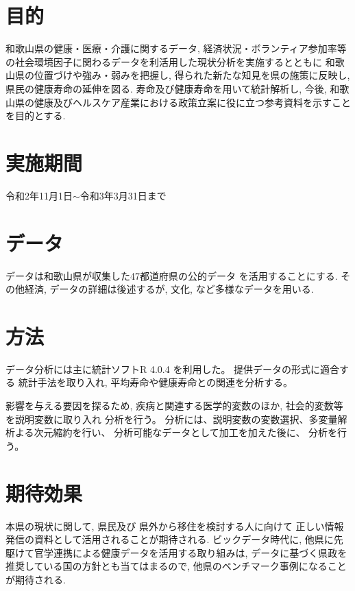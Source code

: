 \documentclass[a4j,11pt,mc, twocolumn]{jreport}
\newcommand{\tb}[1]{\textcolor{blue}{#1}} %
\begin{document}
\section{目的}
和歌山県の健康・医療・介護に関するデータ, 経済状況・ボランティア参加率等の社会環境因子に関わるデータを利活用した現状分析を実施するとともに
和歌山県の位置づけや強み・弱みを把握し,
得られた新たな知見を県の施策に反映し, 県民の健康寿命の延伸を図る.
寿命及び健康寿命を用いて統計解析し,
 今後, 和歌山県の健康及びヘルスケア産業における政策立案に役に立つ参考資料を示すことを目的とする.

\section{実施期間}
令和2年11月1日$\sim$令和3年3月31日まで


\section{データ}
データは和歌山県が収集した47都道府県の公的データ
を活用することにする.
その他経済, データの詳細は後述するが,
文化, など多様なデータを用いる.


\section{方法}
データ分析には主に統計ソフトR 4.0.4
を利用した。
提供データの形式に適合する
統計手法を取り入れ,
平均寿命や健康寿命との関連を分析する。

影響を与える要因を探るため,
疾病と関連する医学的変数のほか, 社会的変数等を説明変数に取り入れ
分析を行う。
分析には、説明変数の変数選択、多変量解析よる次元縮約を行い、
分析可能なデータとして加工を加えた後に、
分析を行う。




\section{期待効果}

本県の現状に関して,
県民及び
県外から移住を検討する人に向けて
正しい情報発信の資料として活用されることが期待される.
ビックデータ時代に, 他県に先駆けて官学連携による健康データを活用する取り組みは, データに基づく県政を推奨している国の方針とも当てはまるので, 他県のベンチマーク事例になることが期待される.
\end{document}
